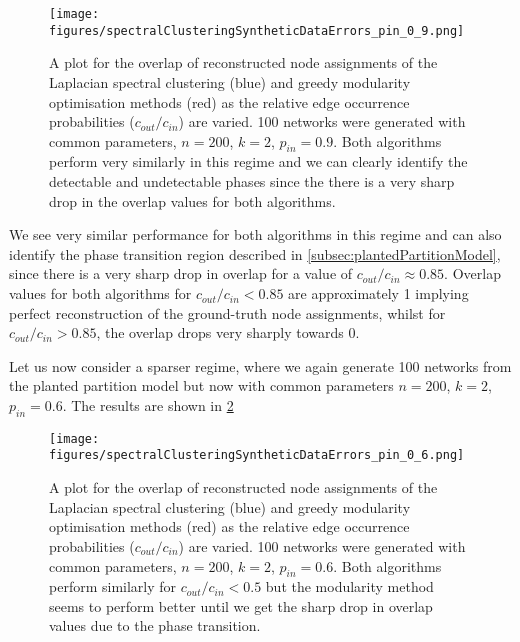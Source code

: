 \begin{figure}
	\centering
	\texttt{[image: figures/spectralClusteringSyntheticDataErrors\_pin\_0\_9.png]}
	\caption[Plot of overlap for spectral clustering and modularity methods in the dense regime.]{\label{fig:syntheticDataResultsPin0.9} A plot for the overlap of reconstructed node assignments of the Laplacian spectral clustering (blue) and greedy modularity optimisation methods (red) as the relative edge occurrence probabilities ($c_{out}/c_{in}$) are varied. 100 networks were generated with common parameters, $n=200$, $k=2$, $p_{in}=0.9$. Both algorithms perform very similarly in this regime and we can clearly identify the detectable and undetectable phases since the there is a very sharp drop in the overlap values for both algorithms.}
\end{figure}

We see very similar performance for both algorithms in this regime and can also identify the phase transition region described in \cref{subsec:plantedPartitionModel}, since there is a very sharp drop in overlap for a value of $c_{out}/c_{in} \approx 0.85$.
Overlap values for both algorithms for $c_{out}/c_{in} < 0.85$ are approximately 1 implying perfect reconstruction of the ground-truth node assignments, whilst for $c_{out}/c_{in} > 0.85$, the overlap drops very sharply towards 0.

Let us now consider a sparser regime, where we again generate 100 networks from the planted partition model but now with common parameters $n=200$, $k=2$, $p_{in}=0.6$.
The results are shown in \cref{fig:syntheticDataResultsPin0.6}

\begin{figure}
	\centering
	\texttt{[image: figures/spectralClusteringSyntheticDataErrors\_pin\_0\_6.png]}
	\caption[Plot of overlap for spectral clustering and modularity methods in the sparse regime.]{\label{fig:syntheticDataResultsPin0.6} A plot for the overlap of reconstructed node assignments of the Laplacian spectral clustering (blue) and greedy modularity optimisation methods (red) as the relative edge occurrence probabilities ($c_{out}/c_{in}$) are varied. 100 networks were generated with common parameters, $n=200$, $k=2$, $p_{in}=0.6$. Both algorithms perform similarly for $c_{out}/c_{in} < 0.5$ but the modularity method seems to perform better until we get the sharp drop in overlap values due to the phase transition.}
\end{figure}

